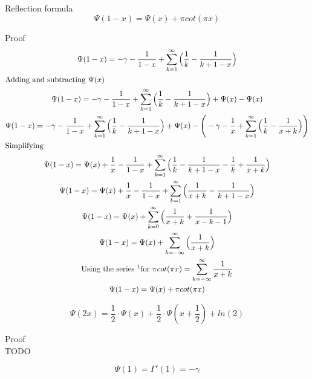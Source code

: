 \documentclass[a4paper]{article}
\begin{document}
\begin{theorem}
Reflection formula
\begin{equation}
\Psi(1-x) = \Psi(x) + \pi cot(\pi x)
\end{equation}

Proof
\begin{gather*}
\Psi(1-x) = -\gamma - \frac{1}{1-x} + \sum_{k=1}^{\infty} \Big( \frac{1}{k} - \frac{1}{k+1-x}  \Big)
\\
\intertext{Adding and subtracting $\Psi(x)$}
\Psi(1-x) = -\gamma - \frac{1}{1-x} + \sum_{k=1}^{\infty} \Big( \frac{1}{k} - \frac{1}{k+1-x}  \Big) + \Psi(x) - \Psi(x) 
\\
\Psi(1-x) = -\gamma - \frac{1}{1-x} + \sum_{k=1}^{\infty} \Big( \frac{1}{k} - \frac{1}{k+1-x}  \Big) + \Psi(x) - \Bigg(-\gamma - \frac{1}{x} + \sum_{k=1}^{\infty} \Big( \frac{1}{k} - \frac{1}{x+k}  \Big) \Bigg)
\\
\intertext{Simplifying}
\Psi(1-x) = \Psi(x) + \frac{1}{x} - \frac{1}{1-x} + \sum_{k=1}^{\infty} \Big( \frac{1}{k} - \frac{1}{k+1-x}  -  \frac{1}{k} + \frac{1}{x+k} \Big)
\\
\Psi(1-x) = \Psi(x) + \frac{1}{x} - \frac{1}{1-x} + \sum_{k=1}^{\infty} \Big(\frac{1}{x+k} - \frac{1}{k+1-x} \Big)
\\
\Psi(1-x) = \Psi(x) + \sum_{k=0}^{\infty} \Big(\frac{1}{x+k} + \frac{1}{x -k -1} \Big)
\\
\Psi(1-x) = \Psi(x) + \sum_{k=-\infty}^{\infty} \Big(\frac{1}{x+k} \Big)
\\
\text{Using the series \footnotemark for }\pi cot(\pi x) = \sum_{k=-\infty}^{\infty} \frac{1}{x + k}
\\
\Psi(1-x) = \Psi(x) + \pi cot(\pi x)
\end{gather*}
\end{theorem}


\begin{theorem}
\begin{equation}
\Psi(2x) = \frac{1}{2} \cdot \Psi(x) + \frac{1}{2} \cdot \Psi(x + \frac{1}{2}) + ln(2)
\end{equation}

Proof
\\
TODO
\end{theorem}

\begin{equation}
\Psi(1) = \Gamma'(1) = - \gamma
\end{equation}
\end{document}
